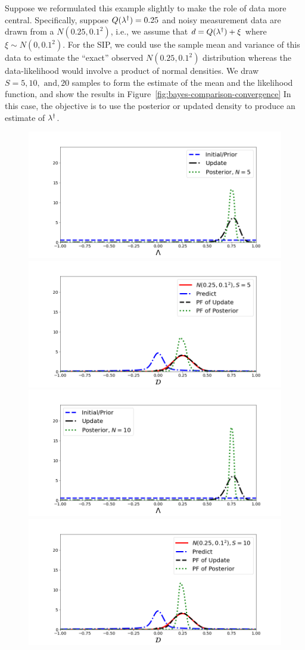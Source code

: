 \begin{ex}
Suppose we reformulated this example slightly to make the role of data more central.
Specifically, suppose $Q(\lambda^\dagger)=0.25$ and noisy measurement data are drawn from a $N(0.25,0.1^2)$, i.e., we assume that $d=Q(\lambda^\dagger)+\xi$ where $\xi\sim N(0,0.1^2)$.
For the SIP, we could use the sample mean and variance of this data to estimate the ``exact'' observed $N(0.25,0.1^2)$ distribution whereas the data-likelihood would involve a product of normal densities.
We draw $S=5, 10, \text{ and}, 20$ samples to form the estimate of the mean and the likelihood function, and show the results in Figure~\ref{fig:bayes-comparison-convergence}
In this case, the objective is to use the posterior or updated density to produce an estimate of $\lambda^\dagger$.

\begin{figure}[htbp]
\centering
   \includegraphics[width=0.49\linewidth]{figures/bip-vs-sip-5.png}
   \includegraphics[width=0.49\linewidth]{figures/bip-vs-sip-pf-5.png}
   \includegraphics[width=0.49\linewidth]{figures/bip-vs-sip-10.png}
   \includegraphics[width=0.49\linewidth]{figures/bip-vs-sip-pf-10.png}

\end{figure}
\end{ex}
